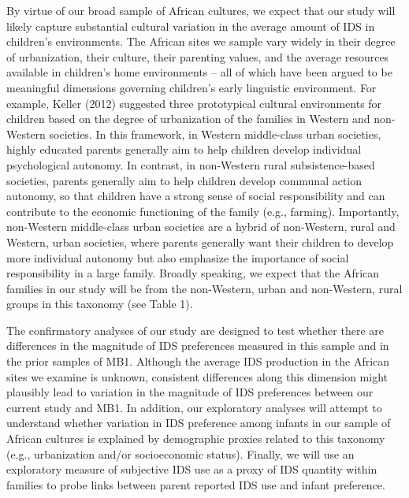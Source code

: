 \documentclass[
  ,man,floatsintext]{apa6}
\begin{document}
By virtue of our broad sample of African cultures, we expect that our study will likely capture substantial cultural variation in the average amount of IDS in children's environments. The African sites we sample vary widely in their degree of urbanization, their culture, their parenting values, and the average resources available in children's home environments -- all of which have been argued to be meaningful dimensions governing children's early linguistic environment. For example, Keller (2012) suggested three prototypical cultural environments for children based on the degree of urbanization of the families in Western and non-Western societies. In this framework, in Western middle-class urban societies, highly educated parents generally aim to help children develop individual psychological autonomy. In contrast, in non-Western rural subsistence-based societies, parents generally aim to help children develop communal action autonomy, so that children have a strong sense of social responsibility and can contribute to the economic functioning of the family (e.g., farming). Importantly, non-Western middle-class urban societies are a hybrid of non-Western, rural and Western, urban societies, where parents generally want their children to develop more individual autonomy but also emphasize the importance of social responsibility in a large family. Broadly speaking, we expect that the African families in our study will be from the non-Western, urban and non-Western, rural groups in this taxonomy (see Table 1).

The confirmatory analyses of our study are designed to test whether there are differences in the magnitude of IDS preferences measured in this sample and in the prior samples of MB1. Although the average IDS production in the African sites we examine is unknown, consistent differences along this dimension might plausibly lead to variation in the magnitude of IDS preferences between our current study and MB1. In addition, our exploratory analyses will attempt to understand whether variation in IDS preference among infants in our sample of African cultures is explained by demographic proxies related to this taxonomy (e.g., urbanization and/or socioeconomic status). Finally, we will use an exploratory measure of subjective IDS use as a proxy of IDS quantity within families to probe links between parent reported IDS use and infant preference.
\end{document}
